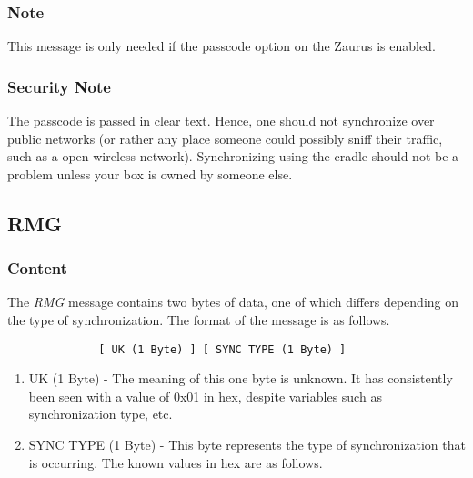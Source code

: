             \subsubsection{Note}

            This message is only needed if the passcode option on the Zaurus
            is enabled.

            \subsubsection{Security Note}

            The passcode is passed in clear text. Hence, one should not
            synchronize over public networks (or rather any place someone
            could possibly sniff their traffic, such as a open wireless
            network). Synchronizing using the cradle should not be a problem
            unless your box is owned by someone else.

        \subsection{RMG}

            \subsubsection{Content}

            The \emph{RMG} message contains two bytes of data, one of which
            differs depending on the type of synchronization. The format of the
            message is as follows.

            \begin{verbatim}
              [ UK (1 Byte) ] [ SYNC TYPE (1 Byte) ]
            \end{verbatim}

            \begin{enumerate}
            \item UK (1 Byte) - The meaning of this one byte is unknown. It
              has consistently been seen with a value of 0x01 in hex, despite
              variables such as synchronization type, etc.

            \item SYNC TYPE (1 Byte) - This byte represents the type of
              synchronization that is occurring. The known values in hex are
              as follows.

              \synctypes

            \end{enumerate}
            
